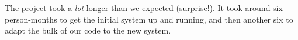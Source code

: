 \documentclass{speauth}
\begin{document}
The project took a \emph{lot} longer than we expected (surprise!).  It
took around six person-months to get the initial system up and
running, and then another six to adapt the bulk of our code to the new
system.










\end{document}
